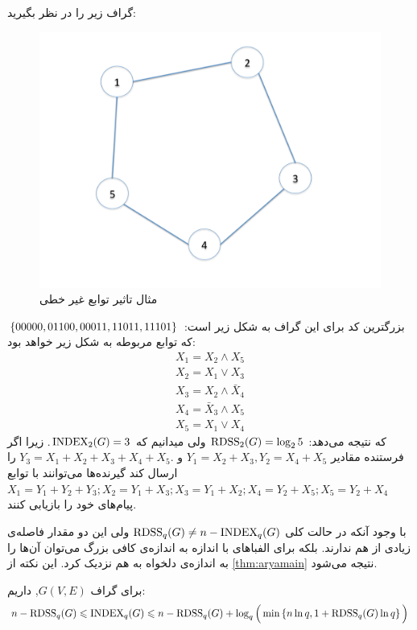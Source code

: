  \begin{example}
 	گراف زیر را در نظر بگیرید:
\begin{figure}[H]
	\centering
	\includegraphics[width=0.7\linewidth]{figs/chapter6/storage-graph-pent}
	\caption[مثال تاثیر توابع غیر خطی]{
		مثال تاثیر توابع غیر خطی
	\cite{arya}
	}
	\label{fig:storage-graph-pent}
\end{figure}
بزرگترین کد برای این گراف به شکل زیر است:
$\left\{ 00000,01100,00011,11011,11101 \right\}$
که توابع مربوطه به شکل زیر خواهد بود:
\begin{align*}
	X_1 = X_2 \wedge X_5 \\
	X_2 = X_1 \vee X_3 \\
	X_3 = X_2 \wedge \bar{X}_4 \\
	X_4 = \bar{X}_3 \wedge X_5 \\
	X_5 = X_1\vee X_4
\end{align*}
که نتیجه می‌دهد:
$\mathrm{RDSS}_2(G) = \log_2 5$
ولی میدانیم که
$\mathrm{INDEX}_2(G)=3$.
زیرا اگر فرستنده مقادیر
 $Y_1= X_2+X_3, Y_2= X_4+X_5$ 
 و
  $Y_3= X_1+X_2+X_3+X_4+X_5.$
  را ارسال کند گیرنده‌ها می‌توانند با توابع
  $X_1 = Y_1 + Y_2+Y_3; X_2 = Y_1+X_3; X_3 = Y_1+X_2; X_4 = Y_2+X_5; X_5 = Y_2+X_4$
  پیام‌های خود را بازیابی کنند.
 \end{example}
 
 با وجود آنکه در حالت کلی 
 $\mathrm{RDSS}_q(G) \ne n - \mathrm{INDEX}_q(G)$
 ولی این دو مقدار فاصله‌ی زیادی از هم ندارند. بلکه برای الفباهای با اندازه به اندازه‌ی کافی بزرگ می‌توان آن‌ها را به اندازه‌ی دلخواه به هم نزدیک کرد. این نکته از 
 \autoref{thm:aryamain}
 نتیجه می‌شود.
 \begin{theorem}\label{thm:aryamain}
 	برای گراف
 	 $G(V,E)$,
 	 داریم:
 	\begin{align}
 		n - \mathrm{RDSS}_q(G) \leqslant \mathrm{INDEX}_q(G) \leqslant n -\mathrm{RDSS}_q(G) + \log_q\Big(\min\left\{ n\ln q, 1+ \mathrm{RDSS}_q(G)\ln q  \right\}\Big)
 	\end{align}
 \end{theorem}
 
